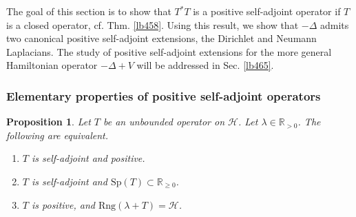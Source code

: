 \documentclass[12pt,b5paper,notitlepage]{article}
\theoremstyle{definition}
\theoremstyle{plain}
\newtheorem{pp}[df]{Proposition}
\newcommand{\Rbb}{\mathbb R}
\newcommand{\Sp}{\mathrm{Sp}}
\newcommand{\Rng}{\mathrm{Rng}}
\newcommand{\MH}{\mathcal H}
\numberwithin{equation}{section}
\begin{document}
The goal of this section is to show that $T^*T$ is a positive self-adjoint operator if $T$ is a closed operator, cf. Thm. \ref{lb458}. Using this result, we show that  $-\Delta$ admits two canonical positive self-adjoint extensions, the Dirichlet and Neumann Laplacians. The study of positive self-adjoint extensions for the more general Hamiltonian operator $-\Delta+V$ will be addressed in Sec. \ref{lb465}.


\subsubsection{Elementary properties of positive self-adjoint operators}



\begin{pp}\label{lb456}
Let $T$ be an unbounded operator on $\MH$. Let $\lambda\in\Rbb_{>0}$. The following are equivalent.
\begin{enumerate}[label=(\arabic*)]
\item $T$ is self-adjoint and positive.
\item $T$ is self-adjoint and $\Sp(T)\subset\Rbb_{\geq0}$.
\item $T$ is positive, and $\Rng(\lambda+T)=\MH$.
\end{enumerate}
\end{pp}
\end{document}
